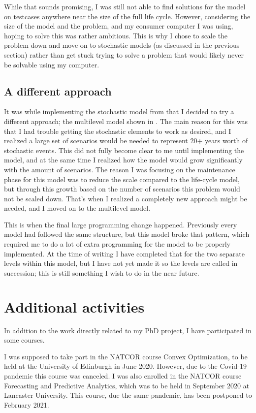 \documentclass[a4paper,12pt]{article}
\begin{document}
While that sounds promising, I was still not able to find solutions for the model on testcases anywhere near the size of the full life cycle. However, considering the size of the model and the problem, and my consumer computer I was using, hoping to solve this was rather ambitious. This is why I chose to scale the problem down and move on to stochastic models (as discussed in the previous section) rather than get stuck trying to solve a problem that would likely never be solvable using my computer. 

\subsection{A different approach}
It was while implementing the stochastic model from  that I decided to try a different approach; the multilevel model shown in . The main reason for this was that I had trouble getting the stochastic elements to work as desired, and I realized a large set of scenarios would be needed to represent 20+ years worth of stochastic events. This did not fully become clear to me until implementing the model, and at the same time I realized how the model would grow significantly with the amount of scenarios. The reason I was focusing on the maintenance phase for this model was to reduce the scale compared to the life-cycle model, but through this growth based on the number of scenarios this problem would not be scaled down. That's when I realized a completely new approach might be needed, and I moved on to the multilevel model. 

This is when the final large programming change happened. Previously every model had followed the same structure, but this model broke that pattern, which required me to do a lot of extra programming for the model to be properly implemented. At the time of writing I have completed that for the two separate levels within this model, but I have not yet made it so the levels are called in succession; this is still something I wish to do in the near future. 

\pagebreak

\section{Additional activities} \label{s:addit} %
In addition to the work directly related to my PhD project, I have participated in some courses. 

I was supposed to take part in the NATCOR course Convex Optimization, to be held at the University of Edinburgh in June 2020. However, due to the Covid-19 pandemic this course was canceled. I was also enrolled in the NATCOR course Forecasting and Predictive Analytics, which was to be held in September 2020 at Lancaster University. This course, due the same pandemic, has been postponed to February 2021. 
\end{document}
